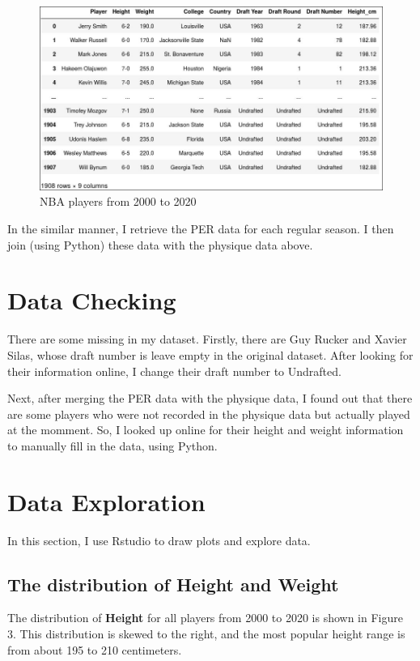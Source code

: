\documentclass[a4paper,12pt,twoside]{article}
\numberwithin{equation}{section}
\begin{document}
\begin{figure}[h]
\caption{NBA players from 2000 to 2020}
\includegraphics[scale=0.34]{nba_ap.jpg}
\centering
\end{figure}


In the similar manner, I retrieve the PER data for each regular season. I then join (using Python) these data with the physique data above.
\section{Data Checking}

There are some missing in my dataset. Firstly, there are Guy Rucker and Xavier Silas, whose draft number is leave empty in the original dataset. After looking for their information online, I change their draft number to Undrafted.

Next, after merging the PER data with the physique data, I found out that there are some players who were not recorded in the physique data but actually played at the momment. So, I looked up online for their height and weight information to manually fill in the data, using Python.

\section{Data Exploration}
In this section, I use Rstudio to draw plots and explore data.
\subsection{The distribution of Height and Weight}
The distribution of \textbf{Height} for all players from 2000 to 2020 is shown in Figure 3. This distribution is skewed to the right, and the most popular height range is from about 195 to 210 centimeters. 
\end{document}
